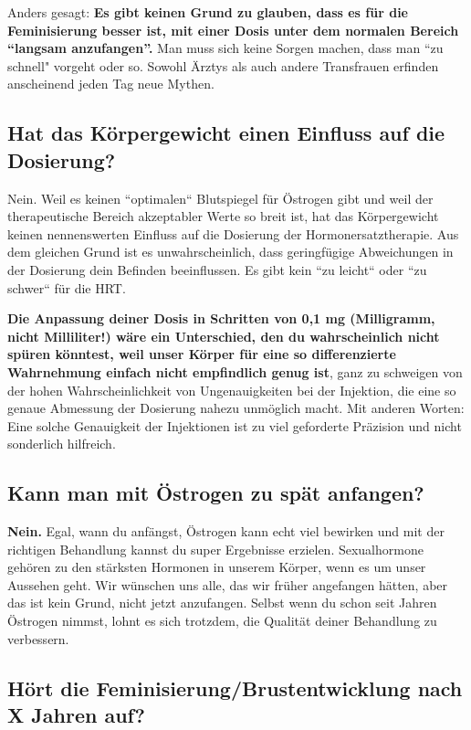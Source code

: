 \documentclass{article}
\begin{document}
Anders gesagt: \textbf{Es gibt keinen Grund zu glauben, dass es für die Feminisierung besser ist, mit einer Dosis unter dem normalen Bereich “langsam anzufangen”.} Man muss sich keine Sorgen machen, dass man “zu schnell" vorgeht oder so. Sowohl Ärztys als auch andere Transfrauen erfinden anscheinend jeden Tag neue Mythen.

\subsection{Hat das Körpergewicht einen Einfluss auf die Dosierung?}

Nein. Weil es keinen “optimalen“ Blutspiegel für Östrogen gibt und weil der therapeutische Bereich akzeptabler Werte so breit ist, hat das Körpergewicht keinen nennenswerten Einfluss auf die Dosierung der Hormonersatztherapie. Aus dem gleichen Grund ist es unwahrscheinlich, dass geringfügige Abweichungen in der Dosierung dein Befinden beeinflussen. Es gibt kein “zu leicht“ oder “zu schwer“ für die HRT.

\textbf{Die Anpassung deiner Dosis in Schritten von 0,1 mg (Milligramm, nicht Milliliter!) wäre ein Unterschied, den du wahrscheinlich nicht spüren könntest, weil unser Körper für eine so differenzierte Wahrnehmung einfach nicht empfindlich genug ist}, ganz zu schweigen von der hohen Wahrscheinlichkeit von Ungenauigkeiten bei der Injektion, die eine so genaue Abmessung der Dosierung nahezu unmöglich macht. Mit anderen Worten: Eine solche Genauigkeit der Injektionen ist zu viel geforderte Präzision und nicht sonderlich hilfreich.

\subsection{Kann man mit Östrogen zu spät anfangen?}\label{11-5}

\textbf{Nein.} Egal, wann du anfängst, Östrogen kann echt viel bewirken und mit der richtigen Behandlung kannst du super Ergebnisse erzielen. Sexualhormone gehören zu den stärksten Hormonen in unserem Körper, wenn es um unser Aussehen geht. Wir wünschen uns alle, das wir früher angefangen hätten, aber das ist kein Grund, nicht jetzt anzufangen. Selbst wenn du schon seit Jahren Östrogen nimmst, lohnt es sich trotzdem, die Qualität deiner Behandlung zu verbessern.

\subsection{Hört die Feminisierung/Brustentwicklung nach X Jahren auf?}\label{11-6}
\end{document}
